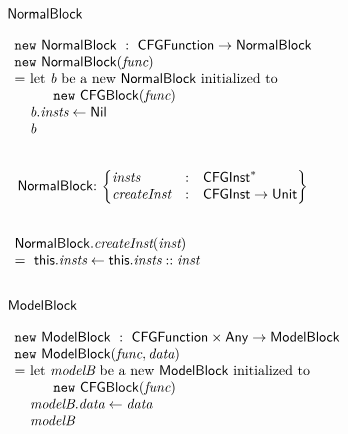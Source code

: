 \subsection{$\mbox{\textsf{NormalBlock}}$}
$
\begin{array}{l@{}l@{~}l}
\lefteqn{\new \ \NormalBlock \ : \ \CFGFunction \rightarrow \NormalBlock}\\
\lefteqn{\new\ \NormalBlock(\emph{func})}\\
& = & \text{let } \emph{b} \text{ be a new } \NormalBlock \text{ initialized to }\\
& & \quad\ \ \new\ \CFGBlock(\emph{func})\\
& & \emph{b}.\emph{insts} \leftarrow \Nil \\
& & \emph{b}\\
\end{array}
$

\noindent
$
\begin{array}{@{~}r@{~}l@{}l@{~}l}
\\
& \NormalBlock & : &
\begin{Bmatrix*}[l]
\emph{insts} & : & \CFGInst^{*} \\
\emph{createInst} & : & \CFGInst \rightarrow \Unit \\
\end{Bmatrix*}\\
\end{array}
$

\noindent
$
\begin{array}{l}
\\
\mbox{\textsf{NormalBlock}}.\emph{createInst}(\emph{inst})\\
= \ \mbox{\textsf{this}}.\emph{insts} \leftarrow \mbox{\textsf{this}}.\emph{insts} :: \emph{inst}\\
\end{array}
$

\subsection{$\mbox{\textsf{ModelBlock}}$}
$
\begin{array}{l@{}l@{~}l}
\lefteqn{\new \ \ModelBlock \ : \ \CFGFunction \times \Any \rightarrow \ModelBlock}\\
\lefteqn{\new\ \ModelBlock(\emph{func}, \emph{data})}\\
& = & \text{let } \emph{modelB} \text{ be a new } \ModelBlock \text{ initialized to }\\
& & \quad\ \ \new\ \CFGBlock(\emph{func})\\
& & \emph{modelB}.\emph{data} \leftarrow \emph{data} \\
& & \emph{modelB}\\
\end{array}
$

